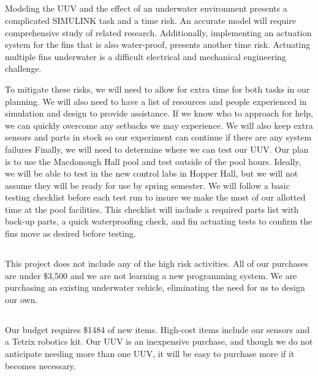 \documentclass{IEEEtran}
\begin{document}
\subsection{}
Modeling the UUV and the effect of an underwater environment presents a complicated SIMULINK task and a time risk. An accurate model will require comprehensive study of related research. Additionally, implementing an actuation system for the fins that is also water-proof, presents another time risk. Actuating multiple fins underwater is a difficult electrical and mechanical engineering challenge.

To mitigate these risks, we will need to allow for extra time for both tasks in our planning. We will also need to have a list of resources and people experienced in simulation and design to provide assistance. If we know who to approach for help, we can quickly overcome any setbacks we may experience. We will also keep extra sensors and parts in stock so our experiment can continue if there are any system failures Finally, we will need to determine where we can test our UUV. Our plan is to use the Macdonough Hall pool and test outside of the pool hours. Ideally, we will be able to test in the new control labs in Hopper Hall, but we will not assume they will be ready for use by spring semester. We will follow a basic testing checklist before each test run to insure we make the most of our allotted time at the pool facilities. This checklist will include a required parts list with back-up parts, a quick waterproofing check, and fin actuating tests to confirm the fins move as desired before testing.

\subsection{}
This project does not include any of the high risk activities. All of our purchases are under \$3,500 and we are not learning a new programming system. We are purchasing an existing underwater vehicle, eliminating the need for us to design our own.

\subsection{}
Our budget requires \$1484 of new items. High-cost items include our sensors and a Tetrix robotics kit. Our UUV is an inexpensive purchase, and though we do not anticipate needing more than one UUV, it will be easy to purchase more if it becomes necessary.
\end{document}
